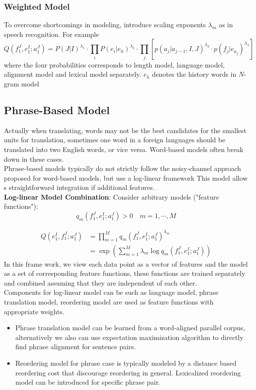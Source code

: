 \subsubsection{Weighted Model}
To overcome shortcomings in modeling, introduce scaling exponents ${\lambda_{m}}$ as in speech recognition. For example
\[ Q(f_1^J, e_1^I; a_1^J) = P(J|I)^{\lambda_1} \cdot \prod_{i} P(e_i|e_h)^{\lambda_2} \cdot \prod_{j} [p(a_j|a_{j-1}, I, J)^{\lambda_{3}} \cdot p(f_j|e_{a_j})^{\lambda_4}]  \]
where the four probabilities corresponds to length model, language model, alignment model and lexical model separately. $e_h$ denotes the history words in $N$-gram model



\subsection{Phrase-Based Model}
Actually when translating, words may not be the best candidates for the smallest units for translation, sometimes one word in a foreign languages should be translated into two English words, or vice versa. Word-based models often break down in these cases.\\
Phrase-based models typically do not strictly follow the noisy-channel approach proposed for word-based models, but use a log-linear framework This model allow s straightforward integration if additional features.\\

\textbf{Log-linear Model Combination}:
Consider arbitrary models ("feature functions"):
\[ q_m(f_1^J, e_1^I; a_1^J) > 0  \quad m = 1, \cdots, M\]

\begin{align*}
	Q(e_1^I, f_1^J; a_1^J) & = \prod_{m=1}^{M} q_m(f_1^J, e_1^I; a_1^J)^{\lambda_m} \\
	& = \exp(\sum_{m=1}^{M} \lambda_m \log q_m(f_1^J, e_1^I; a_1^J))
\end{align*}
In this frame work, we view each data point as a vector of features and the model as a set of corresponding feature functions, these functions are trained separately and combined assuming that they are independent of each other.\\ 

Components for log-linear model can be such as language model, phrase translation model, reordering model are used as feature functions with appropriate weights.
\begin{itemize}
	\item Phrase translation model can be learned from a word-aligned parallel corpus, alternatively we also can use expectation maximization algorithm to directly find phrase alignment for sentence pairs.
	\item Reordering model for phrase case is typically modeled by a distance based reordering cost that discourage reordering in general. Lexicalized reordering model can be introduced for specific phrase pair.
\end{itemize}

